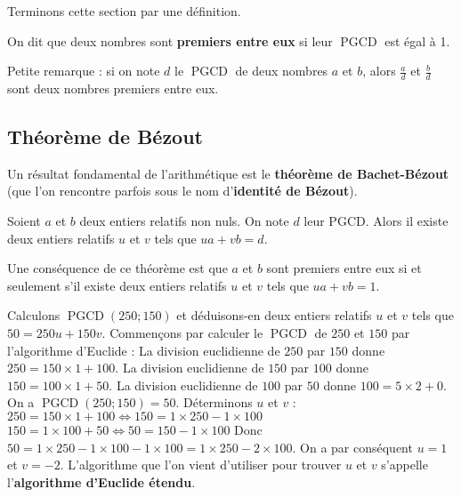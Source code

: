 	Terminons cette section par une définition.

	\begin{formula}
		On dit que deux nombres sont \textbf{premiers entre eux} si leur $\operatorname{PGCD}$ est égal à 1.
	\end{formula}

	\begin{tip}
		Petite remarque : si on note $d$ le $\operatorname{PGCD}$ de deux nombres $a$ et $b$, alors $\frac{a}{d}$ et $\frac{b}{d}$ sont deux nombres premiers entre eux.
	\end{tip}

	\subsection{Théorème de Bézout}

	Un résultat fondamental de l'arithmétique est le \textbf{théorème de Bachet-Bézout} (que l'on rencontre parfois sous le nom d'\textbf{identité de Bézout}).

	\begin{formula}
		Soient $a$ et $b$ deux entiers relatifs non nuls. On note $d$ leur PGCD. Alors il existe deux entiers relatifs $u$ et $v$ tels que $ua + vb = d$.
	\end{formula}

	\begin{formula}
		Une conséquence de ce théorème est que $a$ et $b$ sont premiers entre eux si et seulement s'il existe deux entiers relatifs $u$ et $v$ tels que $ua + vb = 1$.
	\end{formula}

	\begin{tip}[Exemple]
		Calculons $\operatorname{PGCD}(250; 150)$ et déduisons-en deux entiers relatifs $u$ et $v$ tels que $50 = 250u + 150v$.
		Commençons par calculer le $\operatorname{PGCD}$ de $250$ et $150$ par l'algorithme d'Euclide :
		\newpar
		La division euclidienne de $250$ par $150$ donne $250 = 150 \times 1 + 100$.
		\newline
		La division euclidienne de $150$ par $100$ donne $150 = 100 \times 1 + 50$.
		\newline
		La division euclidienne de $100$ par $50$ donne $100 = 5 \times 2 + 0$.
		\newpar
		On a $\operatorname{PGCD}(250;150) = 50$. Déterminons $u$ et $v$ :
		\newpar
		$250 = 150 \times 1 + 100 \iff 150 = 1 \times 250 - 1 \times 100$
		\newline
		$150 = 1 \times 100 + 50 \iff 50 = 150 - 1 \times 100$
		\newpar
		Donc $50 = 1 \times 250 - 1 \times 100 - 1 \times 100 = 1 \times 250 - 2 \times 100$.
		\newpar
		On a par conséquent $u = 1$ et $v = -2$. L'algorithme que l'on vient d'utiliser pour trouver $u$ et $v$ s'appelle l'\textbf{algorithme d'Euclide étendu}.
	\end{tip}

